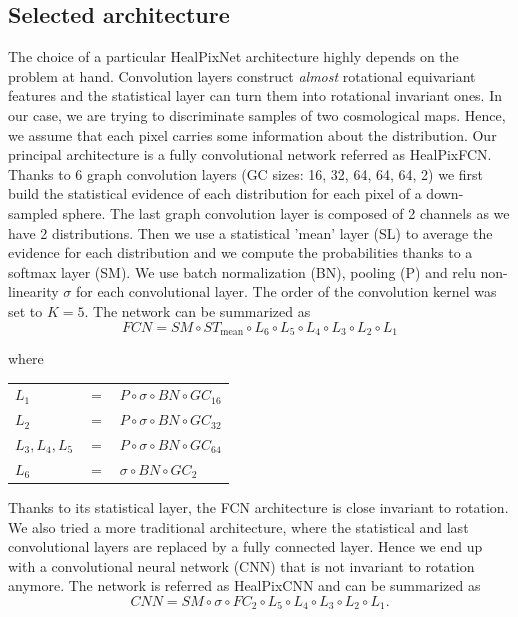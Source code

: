 \documentclass[final,twocolumn,3p,times,authoryear]{elsarticle}
\newcommand{\1}{\b{1}}              %
\newcommand{\0}{\b{0}}              %
\begin{document}
\subsection{Selected architecture}
The choice of a particular HealPixNet architecture highly depends on the problem at hand. Convolution layers construct \emph{almost} rotational equivariant features and the statistical layer can turn them into rotational invariant ones. In our case, we are trying to discriminate samples of two cosmological maps. Hence, we assume that each pixel carries some information about the distribution. Our principal architecture is a fully convolutional network referred as HealPixFCN. Thanks to 6 graph convolution layers (GC sizes: 16, 32, 64, 64, 64, 2) we first build the statistical evidence of each distribution for each pixel of a down-sampled sphere. The last graph convolution layer is composed of 2 channels as we have 2 distributions. Then we use a statistical 'mean' layer (SL) to average the evidence for each distribution and we compute the probabilities thanks to a softmax layer (SM). We use batch normalization (BN), pooling (P) and relu non-linearity $\sigma$ for each convolutional layer. The order of the convolution kernel was set to $K=5$. The network can be summarized as
\begin{equation}
FCN = SM \circ ST_{\text{mean}} \circ L_6 \circ L_5 \circ L_4 \circ L_3 \circ L_2 \circ L_1
\end{equation}
\begin{center}
where \hspace{0.5cm} \begin{tabular}{lll}
   $L_1$ &  $=$ &$ P  \circ \sigma \circ BN  \circ GC_{16}$ \\
   $L_2$ &  $=$ &$ P  \circ \sigma \circ BN  \circ GC_{32}$ \\
   $L_3,L_4,L_5$ & $=$ &$ P \circ  \sigma \circ BN  \circ GC_{64}$ \\
   $L_6$ &  $=$& $ \sigma \circ BN  \circ GC_{2}$ \\
\end{tabular}
\end{center}
Thanks to its statistical layer, the FCN architecture is close invariant to rotation.
We also tried a more traditional architecture, where the statistical and last convolutional layers are replaced by a fully connected layer. Hence we end up with a convolutional neural network (CNN) that is not invariant to rotation anymore. The network is referred as HealPixCNN and can be summarized as
\begin{equation}
CNN = SM \circ \sigma \circ FC_2 \circ L_5 \circ L_4 \circ L_3 \circ L_2 \circ L_1.
\end{equation}
\end{document}
